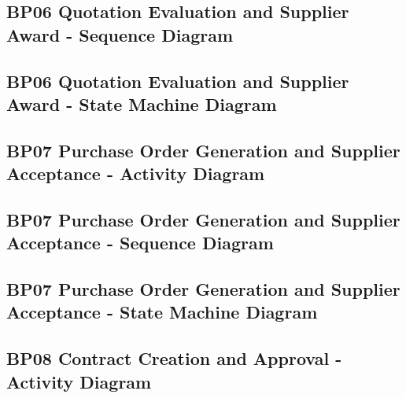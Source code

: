 \documentclass[conference]{IEEEtran}
\begin{document}
\subsection*{BP06 Quotation Evaluation and Supplier Award - Sequence Diagram}



\subsection*{BP06 Quotation Evaluation and Supplier Award - State Machine Diagram}



\subsection*{BP07 Purchase Order Generation and Supplier Acceptance - Activity Diagram}



\subsection*{BP07 Purchase Order Generation and Supplier Acceptance - Sequence Diagram}



\subsection*{BP07 Purchase Order Generation and Supplier Acceptance - State Machine Diagram}



\subsection*{BP08 Contract Creation and Approval - Activity Diagram}

\end{document}
